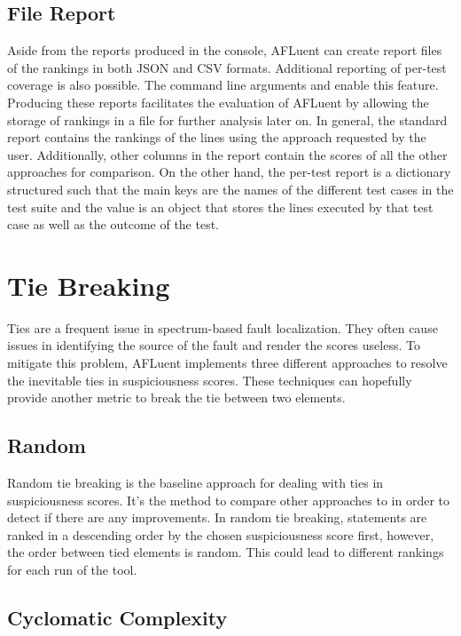 \subsection{File Report}
\label{subsec:file_output}

Aside from the reports produced in the console, AFLuent can create report files
of the rankings in both JSON and CSV formats. Additional reporting of per-test
coverage is also possible. The command line arguments  and
 enable this feature. Producing these reports facilitates
the evaluation of AFLuent by allowing the storage of rankings in a file for
further analysis later on. In general, the standard report contains the rankings
of the lines using the approach requested by the user. Additionally, other
columns in the report contain the scores of all the other approaches for
comparison. On the other hand, the per-test report is a dictionary structured
such that the main keys are the names of the different test cases in the test
suite and the value is an object that stores the lines executed by that test
case as well as the outcome of the test.

\section{Tie Breaking}
\label{sec:tiebreaking}

Ties are a frequent issue in spectrum-based fault localization. They often cause
issues in identifying the source of the fault and render the scores useless. To
mitigate this problem, AFLuent implements three different approaches to resolve
the inevitable ties in suspiciousness scores. These techniques can hopefully
provide another metric to break the tie between two elements.

\subsection{Random}
\label{subsec:tiebreak_random}

Random tie breaking is the baseline approach for dealing with ties in
suspiciousness scores. It's the method to compare other approaches to in order
to detect if there are any improvements. In random tie breaking, statements are
ranked in a descending order by the chosen suspiciousness score first, however,
the order between tied elements is random. This could lead to different rankings
for each run of the tool.

\subsection{Cyclomatic Complexity}
\label{subsec:c_complexity}

